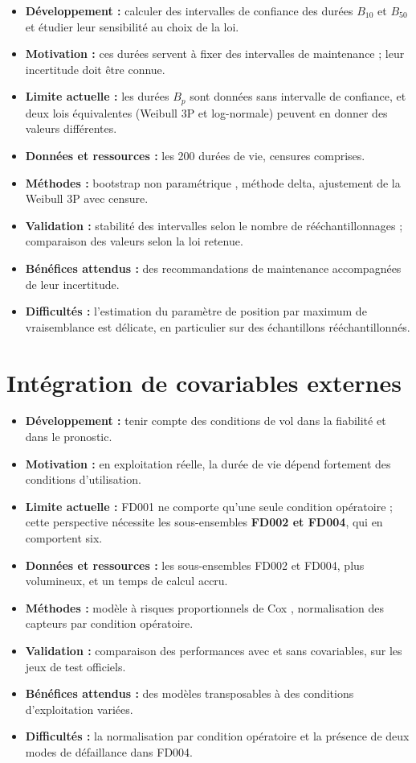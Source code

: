 \begin{itemize}
\item \textbf{Développement :} calculer des intervalles de confiance des durées $B_{10}$ et $B_{50}$ et étudier leur sensibilité au choix de la loi.
\item \textbf{Motivation :} ces durées servent à fixer des intervalles de maintenance ; leur incertitude doit être connue.
\item \textbf{Limite actuelle :} les durées $B_p$ sont données sans intervalle de confiance, et deux lois équivalentes (Weibull 3P et log-normale) peuvent en donner des valeurs différentes.
\item \textbf{Données et ressources :} les 200 durées de vie, censures comprises.
\item \textbf{Méthodes :} bootstrap non paramétrique \cite{efron1979}, méthode delta, ajustement de la Weibull 3P avec censure.
\item \textbf{Validation :} stabilité des intervalles selon le nombre de rééchantillonnages ; comparaison des valeurs selon la loi retenue.
\item \textbf{Bénéfices attendus :} des recommandations de maintenance accompagnées de leur incertitude.
\item \textbf{Difficultés :} l'estimation du paramètre de position par maximum de vraisemblance est délicate, en particulier sur des échantillons rééchantillonnés.
\end{itemize}

\section{Intégration de covariables externes}\label{sec:p-covariables}

\begin{itemize}
\item \textbf{Développement :} tenir compte des conditions de vol dans la fiabilité et dans le pronostic.
\item \textbf{Motivation :} en exploitation réelle, la durée de vie dépend fortement des conditions d'utilisation.
\item \textbf{Limite actuelle :} FD001 ne comporte qu'une seule condition opératoire ; cette perspective nécessite les sous-ensembles \textbf{FD002 et FD004}, qui en comportent six.
\item \textbf{Données et ressources :} les sous-ensembles FD002 et FD004, plus volumineux, et un temps de calcul accru.
\item \textbf{Méthodes :} modèle à risques proportionnels de Cox \cite{cox1972}, normalisation des capteurs par condition opératoire.
\item \textbf{Validation :} comparaison des performances avec et sans covariables, sur les jeux de test officiels.
\item \textbf{Bénéfices attendus :} des modèles transposables à des conditions d'exploitation variées.
\item \textbf{Difficultés :} la normalisation par condition opératoire et la présence de deux modes de défaillance dans FD004.
\end{itemize}

